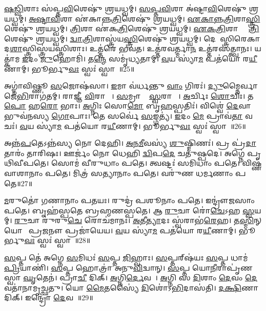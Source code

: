    \ul{𑌷}\ul{𑌡𑍍𑌵𑌿}\ul{}𑌶𑌾𑌃 𑌸॑𑌪𑍍𑌤\ul{𑌵𑌿}\ul{}𑌶𑍇𑌷𑍁॑ 𑌶𑍍𑌰𑌯𑌧𑍍𑌵𑌮𑍍।
   \ul{𑌸}\ul{𑌪𑍍𑌤}\ul{𑌵𑌿}\ul{}𑌶𑌾 𑌅॑𑌷𑍍𑌟𑌾\ul{𑌵𑌿}\ul{}𑌶𑍇𑌷𑍁॑ 𑌶𑍍𑌰𑌯𑌧𑍍𑌵𑌮𑍍।
   \ul{𑌅}\ul{𑌷𑍍𑌟𑌾}\ul{𑌵𑌿}\ul{}𑌶𑌾 𑌏॑𑌕𑌾𑌨𑍍𑌨\ul{𑌤𑍍𑌰𑌿}\ul{}𑌶𑍇𑌷𑍁॑ 𑌶𑍍𑌰𑌯𑌧𑍍𑌵𑌮𑍍।
   \ul{𑌏}\ul{𑌕𑌾}\ul{𑌨𑍍𑌨}\ul{𑌤𑍍𑌰𑌿}\ul{}𑌶𑌾\ul{𑌸𑍍𑌤𑍍𑌰𑌿}\ul{}𑌶𑍇𑌷𑍁॑ 𑌶𑍍𑌰𑌯𑌧𑍍𑌵𑌮𑍍।
   \ul{𑌤𑍍𑌰𑌿}\ul{}𑌶𑌾 𑌏॑𑌕\ul{𑌤𑍍𑌰𑌿}\ul{}𑌶𑍇𑌷𑍁॑ 𑌶𑍍𑌰𑌯𑌧𑍍𑌵𑌮𑍍।
   \ul{𑌏}\ul{𑌕}\ul{𑌤𑍍𑌰𑌿}\ul{}𑌶𑌾 𑌦𑍍𑌵𑌾᳚\ul{𑌤𑍍𑌰𑌿}\ul{}𑌶𑍇𑌷𑍁॑ 𑌶𑍍𑌰𑌯𑌧𑍍𑌵𑌮𑍍।
   \ul{𑌦𑍍𑌵𑌾}\ul{𑌤𑍍𑌰𑌿}\ul{}𑌶𑌾𑌸𑍍𑌤𑍍𑌰॑𑌯\-\ul{𑌸𑍍𑌤𑍍𑌰𑌿}\ul{}\-𑌶𑍇𑌷𑍁॑ 𑌶𑍍𑌰𑌯𑌧𑍍𑌵𑌮𑍍।
   𑌦𑍇𑌵𑌾᳚𑌸𑍍𑌤𑍍𑌰𑌿𑌰𑍇𑌕𑌾𑌦\ul{𑌶𑌾}𑌸𑍍𑌤𑍍𑌰𑌿𑌸𑍍𑌤𑍍𑌰॑𑌯\-𑌸𑍍𑌤𑍍𑌰𑌿𑌶𑌾𑌃।
   𑌉𑌤𑍍𑌤॑𑌰𑍇 𑌭𑌵𑌤।
   𑌉𑌤𑍍𑌤॑𑌰𑌵𑌰𑍍𑌤𑍍𑌮𑌾\ul{𑌨} 𑌉𑌤𑍍𑌤॑𑌰𑌸𑌤𑍍𑌤𑍍𑌵𑌾𑌨𑌃।
   𑌯𑌤𑍍𑌕𑌾॑𑌮 \ul{𑌇}𑌦𑌂 \ul{𑌜𑍁}𑌹𑍋𑌮𑌿॑।
   𑌤\ul{𑌨𑍍𑌮𑍇} 𑌸𑌮𑍃॑𑌧𑍍𑌯𑌤𑌾𑌮𑍍।
   \ul{𑌵}𑌯 𑌸𑍍𑌯𑌾॑\ul{𑌮} 𑌪𑌤॑𑌯𑍋 𑌰\ul{𑌯𑍀}𑌣𑌾𑌮𑍍।
   𑌭𑍂𑌰𑍍𑌭𑍁\ul{𑌵𑌃} 𑌸𑍍𑌵𑌃॑ 𑌸𑍍𑌵𑌾𑌹𑌾᳚॥25॥
   \anuvakamend
   
   𑌅𑌗𑍍𑌨𑌾॑𑌵𑌿𑌷𑍍𑌣𑍂 \ul{𑌸}𑌜𑍋𑌷॑𑌸𑌾।
   \ul{𑌇}𑌮𑌾 𑌵॑𑌰𑍍𑌧𑌨𑍍𑌤𑍁 \ul{𑌵𑌾𑌂} 𑌗𑌿𑌰𑌃॑।
   \ul{𑌦𑍍𑌯𑍁}𑌮𑍍𑌨𑍈𑌰𑍍𑌵𑌾𑌜𑍇॑\ul{𑌭𑌿}𑌰𑌾𑌗॑𑌤𑌮𑍍।
   𑌰𑌾𑌜𑍍𑌞𑍀॑ \ul{𑌵𑌿}𑌰𑌾𑌜𑍍𑌞𑍀᳚।
   \ul{𑌸}𑌮𑍍𑌰𑌾𑌜𑍍𑌞𑍀᳚ \ul{𑌸𑍍𑌵}𑌰𑌾𑌜𑍍𑌞𑍀᳚।
   \ul{𑌅}𑌰𑍍𑌚𑌿𑌃 \ul{𑌶𑍋}𑌚𑌿𑌃।
   𑌤\ul{𑌪𑍋} 𑌹\ul{𑌰𑍋} 𑌭𑌾𑌃।
   \ul{𑌅}𑌗𑍍𑌨𑌿𑌃 𑌸𑍋\ul{𑌮𑍋} 𑌬𑍃\ul{𑌹}𑌸𑍍𑌪𑌤𑌿𑌃॑।
   𑌵𑌿𑌶𑍍𑌵𑍇॑ \ul{𑌦𑍇}𑌵𑌾 𑌭𑍁𑌵॑𑌨𑌸𑍍𑌯 \ul{𑌗𑍋}𑌪𑌾𑌃।
   𑌤𑍇 𑌸𑌰𑍍𑌵𑍇॑ \ul{𑌸}𑌙𑍍𑌗𑌤𑍍𑌯॑।
   \ul{𑌇}𑌦𑌂 \ul{𑌮𑍇} 𑌪𑍍𑌰𑌾𑌵॑\ul{𑌤𑌾} 𑌵𑌚𑌃॑।
   \ul{𑌵}𑌯 𑌸𑍍𑌯𑌾॑\ul{𑌮} 𑌪𑌤॑𑌯𑍋 𑌰\ul{𑌯𑍀}𑌣𑌾𑌮𑍍।
   𑌭𑍂𑌰𑍍𑌭𑍁\ul{𑌵𑌃} 𑌸𑍍𑌵𑌃॑ 𑌸𑍍𑌵𑌾𑌹𑌾᳚॥26॥
   \anuvakamend
   
   𑌅𑌨𑍍𑌨॑\ul{𑌪}𑌤𑍇𑌽𑌨𑍍𑌨॑𑌸𑍍𑌯 𑌨𑍋 𑌦𑍇𑌹𑌿।
   \ul{𑌅}\ul{𑌨}\ul{𑌮𑍀}𑌵𑌸𑍍𑌯॑ \ul{𑌶𑍁}𑌷𑍍𑌮𑌿𑌣𑌃॑।
   𑌪𑍍𑌰 𑌪𑍍𑌰॑\ul{𑌦𑌾}𑌤𑌾𑌰𑌂॑ 𑌤𑌾𑌰𑌿𑌷𑌃।
   𑌊𑌰𑍍𑌜𑌂॑ 𑌨𑍋 𑌧𑍇𑌹𑌿 \ul{𑌦𑍍𑌵𑌿}𑌪\ul{𑌦𑍇} 𑌚𑌤𑍁॑𑌷𑍍𑌪𑌦𑍇।
   𑌅𑌗𑍍𑌨𑍇॑ 𑌪𑍃𑌥𑌿𑌵𑍀𑌪𑌤𑍇।
   𑌸𑍋𑌮॑ 𑌵𑍀𑌰𑍁𑌧𑌾𑌂 𑌪𑌤𑍇।
   𑌤𑍍𑌵𑌷𑍍𑌟𑌃॑ 𑌸𑌮𑌿𑌧𑌾𑌂 𑌪𑌤𑍇।
   𑌵𑌿𑌷𑍍𑌣॑𑌵𑌾𑌶𑌾𑌨𑌾𑌂 𑌪𑌤𑍇।
   𑌮𑌿𑌤𑍍𑌰॑ 𑌸𑌤𑍍𑌯𑌾𑌨𑌾𑌂 𑌪𑌤𑍇।
   𑌵𑌰𑍁॑𑌣 𑌧𑌰𑍍𑌮𑌣𑌾𑌂 𑌪𑌤𑍇॥27॥

   \ul{𑌮}𑌰𑍁𑌤𑍋॑  𑌗𑌣𑌾𑌨𑌾𑌂 𑌪𑌤𑌯𑌃।
   𑌰𑍁𑌦𑍍𑌰॑ 𑌪𑌶𑍂𑌨𑌾𑌂 𑌪𑌤𑍇।
   𑌇𑌨𑍍𑌦𑍍𑌰𑍗॑𑌜𑌸𑌾𑌂 𑌪𑌤𑍇।
   𑌬𑍃𑌹॑𑌸𑍍𑌪𑌤𑍇 𑌬𑍍𑌰𑌹𑍍𑌮𑌣𑌸𑍍𑌪𑌤𑍇।
   𑌆 \ul{𑌰𑍁}𑌚𑌾 𑌰𑍋॑\ul{𑌚𑍇}𑌽𑌹 \ul{𑌸𑍍𑌵}𑌯𑌮𑍍।
   \ul{𑌰𑍁}𑌚𑌾 𑌰𑍁॑𑌰𑍁\ul{𑌚𑍇} 𑌰𑍋𑌚॑𑌮𑌾𑌨𑌃।
   \ul{𑌅}𑌤𑍀\ul{𑌤𑍍𑌯𑌾}𑌦𑌃 𑌸𑍍𑌵॑𑌰𑌾𑌭॑\ul{𑌰𑍇}𑌹।
   𑌤\ul{𑌸𑍍𑌮𑌿}𑌨𑍍 𑌯𑍋𑌨𑍗᳚ 𑌪𑍍𑌰\ul{𑌜}𑌨𑍗 𑌪𑍍𑌰𑌜𑌾॑𑌯𑍇𑌯।
   \ul{𑌵}𑌯 𑌸𑍍𑌯𑌾॑\ul{𑌮} 𑌪𑌤॑𑌯𑍋 𑌰\ul{𑌯𑍀}𑌣𑌾𑌮𑍍।
   𑌭𑍂𑌰𑍍𑌭𑍁\ul{𑌵𑌃} 𑌸𑍍𑌵𑌃॑ 𑌸𑍍𑌵𑌾𑌹𑌾᳚॥28॥
  \anuvakamend
  
    \ul{𑌸}𑌪𑍍𑌤 𑌤𑍇॑ 𑌅𑌗𑍍𑌨𑍇 \ul{𑌸}𑌮𑌿𑌧𑌃॑ \ul{𑌸}𑌪𑍍𑌤 \ul{𑌜𑌿}𑌹𑍍𑌵𑌾𑌃।
   \ul{𑌸}𑌪𑍍𑌤𑌰𑍍{‌}𑌷॑𑌯𑌃 \ul{𑌸}𑌪𑍍𑌤 𑌧𑌾𑌮॑ \ul{𑌪𑍍𑌰𑌿}𑌯𑌾𑌣𑌿॑।
   \ul{𑌸}𑌪𑍍𑌤 𑌹𑍋𑌤𑍍𑌰𑌾॑ 𑌅𑌨𑍁\ul{𑌵𑌿}𑌦𑍍𑌵𑌾𑌨𑍍।
   \ul{𑌸}𑌪𑍍𑌤 𑌯𑍋\ul{𑌨𑍀}𑌰𑌾𑌪𑍃॑𑌣𑌸𑍍𑌵𑌾 \ul{𑌘𑍃}𑌤𑍇𑌨॑।
   𑌪𑍍𑌰𑌾\ul{𑌚𑍀} 𑌦𑌿𑌕𑍍।
   \ul{𑌅}𑌗𑍍𑌨𑌿\ul{𑌰𑍍𑌦𑍇}𑌵𑌤𑌾᳚।
   \ul{𑌅}𑌗𑍍𑌨𑌿 𑌸 \ul{𑌦𑌿}𑌶𑌾𑌂 \ul{𑌦𑍇}𑌵𑌂 \ul{𑌦𑍇}𑌵𑌤𑌾॑𑌨𑌾𑌮𑍃𑌚𑍍𑌛𑌤𑍁।
   𑌯𑍋 \ul{𑌮𑍈}𑌤𑌸𑍍𑌯𑍈॑ \ul{𑌦𑌿}𑌶𑍋॑𑌽\ul{𑌭𑌿}𑌦𑌾𑌸॑𑌤𑌿।
   \ul{𑌦}\ul{𑌕𑍍𑌷𑌿}𑌣𑌾 𑌦𑌿𑌕𑍍।
   𑌇𑌨𑍍𑌦𑍍𑌰𑍋॑ \ul{𑌦𑍇}𑌵𑌤𑌾᳚॥29॥

